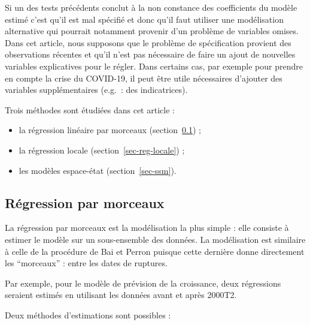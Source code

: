 \documentclass[
  a4paper,
  DIV=11,
  numbers=noendperiod,
  french]{scrartcl}
\newcommand\1{{\mathds 1}}
\theoremstyle{remark}
\begin{document}
Si un des tests précédents conclut à la non constance des coefficients
du modèle estimé c'est qu'il est mal spécifié et donc qu'il faut
utiliser une modélisation alternative qui pourrait notamment provenir
d'un problème de variables omises. Dans cet article, nous supposons que
le problème de spécification provient des observations récentes et qu'il
n'est pas nécessaire de faire un ajout de nouvelles variables
explicatives pour le régler. Dans certains cas, par exemple pour prendre
en compte la crise du COVID-19, il peut être utile nécessaires d'ajouter
des variables supplémentaires (e.g.~: des indicatrices).

Trois méthodes sont étudiées dans cet article :

\begin{itemize}
\item
  la régression linéaire par morceaux (section~\ref{sec-reg-morceaux}) ;
\item
  la régression locale (section~\ref{sec-reg-locale}) ;
\item
  les modèles espace-état (section~\ref{sec-ssm}).
\end{itemize}

\subsection{Régression par morceaux}\label{sec-reg-morceaux}

La régression par morceaux est la modélisation la plus simple : elle
consiste à estimer le modèle sur un sous-ensemble des données. La
modélisation est similaire à celle de la procédure de Bai et Perron
puisque cette dernière donne directement les ``morceaux'' : entre les
dates de ruptures.

Par exemple, pour le modèle de prévision de la croissance, deux
régressions seraient estimés en utilisant les données avant et après
2000T2.

Deux méthodes d'estimations sont possibles :
\end{document}
